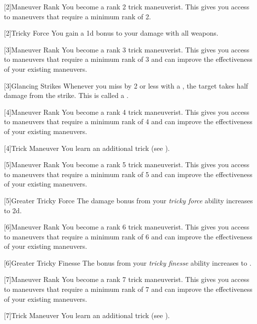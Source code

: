         {
            [2]{Maneuver Rank} You become a rank 2 trick maneuverist.
            This gives you access to maneuvers that require a minimum rank of 2.

            [2]{Tricky Force} You gain a \plus1d bonus to your damage with all weapons.
        }

        {
            [3]{Maneuver Rank} You become a rank 3 trick maneuverist.
            This gives you access to maneuvers that require a minimum rank of 3 and can improve the effectiveness of your existing maneuvers.

            [3]{Glancing Strikes} Whenever you miss by 2 or less with a , the target takes half damage from the strike.
            This is called a .
        }

        {
            [4]{Maneuver Rank} You become a rank 4 trick maneuverist.
            This gives you access to maneuvers that require a minimum rank of 4 and can improve the effectiveness of your existing maneuvers.

            [4]{Trick Maneuver}
            You learn an additional trick  (see ).
        }

        {
            [5]{Maneuver Rank} You become a rank 5 trick maneuverist.
            This gives you access to maneuvers that require a minimum rank of 5 and can improve the effectiveness of your existing maneuvers.

            [5]{Greater Tricky Force} The damage bonus from your \textit{tricky force} ability increases to \plus2d.
        }

        {
            [6]{Maneuver Rank} You become a rank 6 trick maneuverist.
            This gives you access to maneuvers that require a minimum rank of 6 and can improve the effectiveness of your existing maneuvers.

            [6]{Greater Tricky Finesse} The bonus from your \textit{tricky finesse} ability increases to .
        }

        {
            [7]{Maneuver Rank} You become a rank 7 trick maneuverist.
            This gives you access to maneuvers that require a minimum rank of 7 and can improve the effectiveness of your existing maneuvers.

            [7]{Trick Maneuver}
            You learn an additional trick  (see ).
        }

